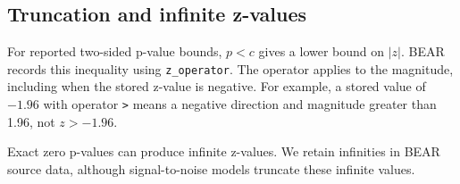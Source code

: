 \documentclass[
  11pt,
]{article}
\begin{document}
\subsection{Truncation and infinite
z-values}\label{truncation-and-infinite-z-values}

For reported two-sided p-value bounds, \(p<c\) gives a lower bound on
\(|z|\). BEAR records this inequality using \texttt{z\_operator}. The
operator applies to the magnitude, including when the stored z-value is
negative. For example, a stored value of \(-1.96\) with operator
\texttt{\textgreater{}} means a negative direction and magnitude greater
than 1.96, not \(z>-1.96\).

Exact zero p-values can produce infinite z-values. We retain infinities
in BEAR source data, although signal-to-noise models truncate these
infinite values.
\end{document}
